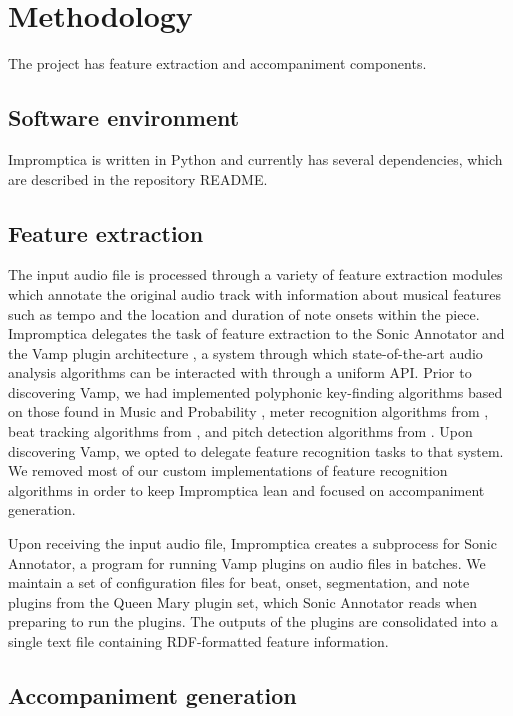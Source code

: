 \documentclass[11pt,conference,letterpaper]{IEEEtran}
\begin{document}
\section{Methodology}

The project has feature extraction and accompaniment components.

\subsection{Software environment}

Impromptica is written in Python and currently has several dependencies, which are described in the repository README.

\subsection{Feature extraction}

The input audio file is processed through a variety of feature extraction modules which annotate the original audio track with information about musical features such as tempo and the location and duration of note onsets within the piece. Impromptica delegates the task of feature extraction to the Sonic Annotator and the Vamp plugin architecture \cite{cannam2010sonic}, a system through which state-of-the-art audio analysis algorithms can be interacted with through a uniform API. Prior to discovering Vamp, we had implemented polyphonic key-finding algorithms based on those found in Music and Probability \cite{temperly2007mprob}, meter recognition algorithms from \cite{klapuri2006analysis}, beat tracking algorithms from \cite{ellis2007beat}, and pitch detection algorithms from \cite{klapuri2003multiple}. Upon discovering Vamp, we opted to delegate feature recognition tasks to that system. We removed most of our custom implementations of feature recognition algorithms in order to keep Impromptica lean and focused on accompaniment generation.

Upon receiving the input audio file, Impromptica creates a subprocess for Sonic Annotator, a program for running Vamp plugins on audio files in batches. We maintain a set of configuration files for beat, onset, segmentation, and note plugins from the Queen Mary plugin set, which Sonic Annotator reads when preparing to run the plugins. The outputs of the plugins are consolidated into a single text file containing RDF-formatted feature information.

\subsection{Accompaniment generation}
\end{document}
